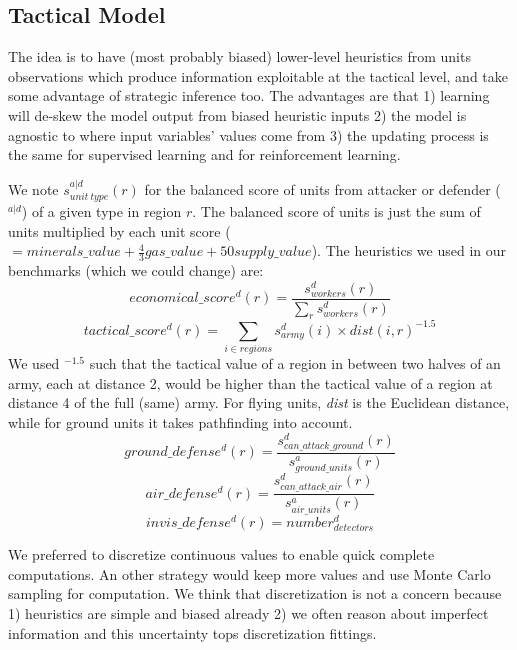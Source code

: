\subsection{Tactical Model}
The idea is to have (most probably biased) lower-level heuristics from units observations which produce information exploitable at the tactical level, and take some advantage of strategic inference too. The advantages are that 1) learning will de-skew the model output from biased heuristic inputs 2) the model is agnostic to where input variables' values come from 3) the updating process is the same for supervised learning and for reinforcement learning. 

We note $s^{a|d}_{unit\ type}(r)$ for the balanced score of units from attacker or defender ($^{a|d}$) of a given type in region $r$. The balanced score of units is just the sum of units multiplied by each unit score ($= minerals\_value + \frac{4}{3}gas\_value + 50supply\_value$). The heuristics we used in our benchmarks (which we could change) are: 
$$economical\_score^d(r) = \frac{s^d_{workers}(r)}{\sum_r s^d_{workers}(r)}$$
$$tactical\_score^d(r) = \sum_{i \in regions} s^d_{army}(i) \times dist(i,r)^{-1.5}$$
We used $^{-1.5}$ such that the tactical value of a region in between two halves of an army, each at distance 2, would be higher than the tactical value of a region at distance 4 of the full (same) army. For flying units, \textit{dist} is the Euclidean distance, while for ground units it takes pathfinding into account.
$$ground\_defense^d(r) = \frac{s^d_{can\_attack\_ground}(r)}{s^a_{ground\_units}(r)}$$
$$air\_defense^d(r) = \frac{s^d_{can\_attack\_air}(r)}{s^a_{air\_units}(r)}$$
$$invis\_defense^d(r) = number^d_{detectors}$$

We preferred to discretize continuous values to enable quick complete computations. An other strategy would keep more values and use Monte Carlo sampling for computation. We think that discretization is not a concern because 1) heuristics are simple and biased already 2) we often reason about imperfect information and this uncertainty tops discretization fittings.
